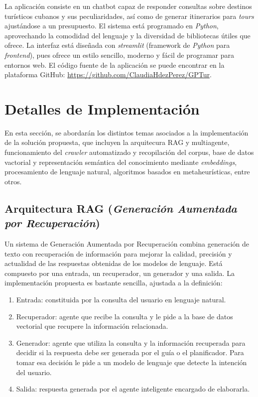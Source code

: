 \documentclass[10pt]{llncs}
\begin{document}
La aplicación consiste en un chatbot capaz de responder consultas sobre destinos turísticos cubanos y sus peculiaridades, así como de generar itinerarios para \textit{tours} ajustándose a un presupuesto. 
El sistema está programado en \textit{Python}, aprovechando la comodidad del lenguaje y la diversidad de bibliotecas útiles que ofrece. La interfaz está diseñada con \textit{streamlit} (framework de \textit{Python} para \textit{frontend}), 
pues ofrece un estilo sencillo, moderno y fácil de programar para entornos web. El código fuente de la aplicación se puede encontrar en 
la plataforma GitHub: \href{https://github.com/ClaudiaHdezPerez/GPTur}{\color{blue}https://github.com/ClaudiaHdezPerez/GPTur}.

\section{Detalles de Implementación}\label{sec:implementacion}

En esta sección, se abordarán los distintos temas asociados a la implementación de la solución propuesta, que incluyen la arquitecura RAG y multiagente, funcionamiento del \textit{crawler} automatizado y recopilación del corpus, base de datos vactorial y representación semántica del 
conocimiento mediante \textit{embeddings}, procesamiento de lenguaje natural, algoritmos basados en metaheurísticas, entre otros. 

\vspace{\baselineskip}

\subsection{Arquitectura RAG (\textit{Generación Aumentada por Recuperación})}\label{sec:rag}

Un sistema de Generación Aumentada por Recuperación combina generación de texto con recuperación de información para mejorar la calidad, precisión y actualidad de las respuestas obtenidas de los modelos de lenguaje. 
Está compuesto por una entrada, un recuperador, un generador y una salida. La implementación propuesta es bastante sencilla, ajustada a la definición:
\begin{enumerate}
    \item Entrada: constituida por la consulta del usuario en lenguaje natural.
    \item Recuperador: agente que recibe la consulta y le pide a la base de datos vectorial que recupere la información relacionada.
    \item Generador: agente que utiliza la consulta y la información recuperada para decidir si la respuesta debe ser generada por el guía o el planificador. Para tomar esa decisión le pide a un modelo de lenguaje que detecte la intención del usuario.
    \item Salida: respuesta generada por el agente inteligente encargado de elaborarla.
\end{enumerate}
\end{document}
